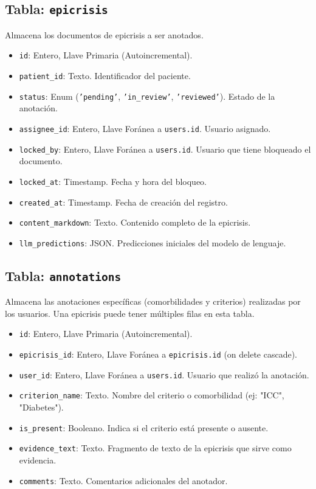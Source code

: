 \documentclass{article}
\begin{document}
\subsection{Tabla: \texttt{epicrisis}}
Almacena los documentos de epicrisis a ser anotados.

\begin{itemize}
    \item \texttt{id}: Entero, Llave Primaria (Autoincremental).
    \item \texttt{patient\_id}: Texto. Identificador del paciente.
    \item \texttt{status}: Enum (\texttt{'pending'}, \texttt{'in\_review'}, \texttt{'reviewed'}). Estado de la anotación.
    \item \texttt{assignee\_id}: Entero, Llave Foránea a \texttt{users.id}. Usuario asignado.
    \item \texttt{locked\_by}: Entero, Llave Foránea a \texttt{users.id}. Usuario que tiene bloqueado el documento.
    \item \texttt{locked\_at}: Timestamp. Fecha y hora del bloqueo.
    \item \texttt{created\_at}: Timestamp. Fecha de creación del registro.
    \item \texttt{content\_markdown}: Texto. Contenido completo de la epicrisis.
    \item \texttt{llm\_predictions}: JSON. Predicciones iniciales del modelo de lenguaje.
\end{itemize}

\subsection{Tabla: \texttt{annotations}}
Almacena las anotaciones específicas (comorbilidades y criterios) realizadas por los usuarios. Una epicrisis puede tener múltiples filas en esta tabla.

\begin{itemize}
    \item \texttt{id}: Entero, Llave Primaria (Autoincremental).
    \item \texttt{epicrisis\_id}: Entero, Llave Foránea a \texttt{epicrisis.id} (on delete cascade).
    \item \texttt{user\_id}: Entero, Llave Foránea a \texttt{users.id}. Usuario que realizó la anotación.
    \item \texttt{criterion\_name}: Texto. Nombre del criterio o comorbilidad (ej: "ICC", "Diabetes").
    \item \texttt{is\_present}: Booleano. Indica si el criterio está presente o ausente.
    \item \texttt{evidence\_text}: Texto. Fragmento de texto de la epicrisis que sirve como evidencia.
    \item \texttt{comments}: Texto. Comentarios adicionales del anotador.
\end{itemize}
\end{document}
